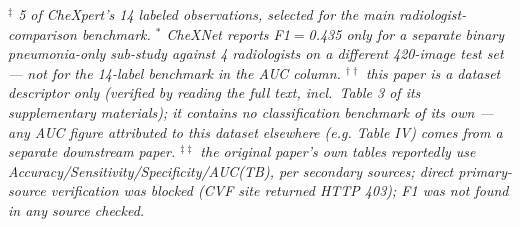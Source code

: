 \documentclass[a4paper,11pt]{article}
\begin{document}
\vspace{4pt}
\footnotesize\textit{$^\ddagger$ 5 of CheXpert's 14 labeled observations, selected for the main radiologist-comparison benchmark. $^{*}$ CheXNet reports F1$=$0.435 only for a separate binary pneumonia-only sub-study against 4 radiologists on a different 420-image test set --- not for the 14-label benchmark in the AUC column. $^{\dagger\dagger}$ this paper is a dataset descriptor only (verified by reading the full text, incl.\ Table 3 of its supplementary materials); it contains no classification benchmark of its own --- any AUC figure attributed to this dataset elsewhere (e.g. Table IV) comes from a separate downstream paper. $^{\ddagger\ddagger}$ the original paper's own tables reportedly use Accuracy/Sensitivity/Specificity/AUC(TB), per secondary sources; direct primary-source verification was blocked (CVF site returned HTTP 403); F1 was not found in any source checked.}
\end{document}
